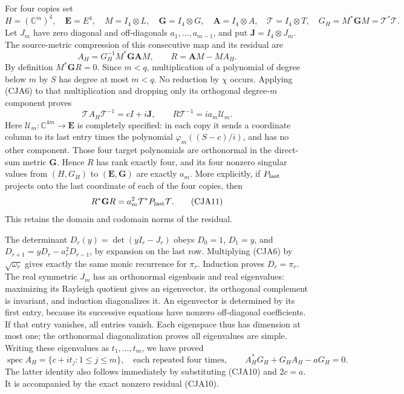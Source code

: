 For four copies set
\[
 H=(\mathbb C^m)^4,\quad
 \mathbf E=E^4,\quad
 M=I_4\otimes L,\quad
 \mathbf G=I_4\otimes G,\quad
 \mathbf A=I_4\otimes A,\quad
 \mathcal T=I_4\otimes T,\quad
 G_H=M^*\mathbf GM=\mathcal T^*\mathcal T.
\]
Let \(J_m\) have zero diagonal and off-diagonals
\(a_1,\ldots,a_{m-1}\), and put \(\mathbf J=I_4\otimes J_m\).
The source-metric compression of this consecutive map and its residual are
\begin{equation}
 A_H=G_H^{-1}M^*\mathbf G\mathbf AM,\qquad
 R=\mathbf AM-MA_H .
 \tag{CJA9}
\end{equation}
By definition \(M^*\mathbf GR=0\).
Since \(m<q\), multiplication of a polynomial of degree below \(m\)
by \(S\) has degree at most \(m<q\).  No reduction by \(\chi\)
occurs.  Applying (CJA6) to that multiplication and dropping only its
orthogonal degree-\(m\) component proves
\begin{equation}
 \boxed{\mathcal TA_H\mathcal T^{-1}=cI+i\mathbf J,\qquad
 R\mathcal T^{-1}=i a_m\mathcal U_m.}
 \tag{CJA10}
\end{equation}
Here \(\mathcal U_m:\mathbb C^{4m}\to\mathbf E\) is completely specified:
in each copy it sends a coordinate column to its last entry times the
polynomial \(\varphi_m((S-c)/i)\), and has no other component.
Those four target polynomials are orthonormal in the direct-sum
metric \(\mathbf G\).  Hence \(R\) has rank exactly four, and its four
nonzero singular values from \((H,G_H)\) to
\((\mathbf E,\mathbf G)\) are exactly \(a_m\).
More explicitly, if \(P_{\rm last}\) projects onto the last coordinate
of each of the four copies, then
\begin{equation}
 R^*\mathbf GR=a_m^2\mathcal T^*P_{\rm last}\mathcal T .
 \tag{CJA11}
\end{equation}
This retains the domain and codomain norms of the residual.

The determinant \(D_r(y)=\det(yI_r-J_r)\) obeys
\(D_0=1\), \(D_1=y\), and
\(D_{r+1}=yD_r-a_r^2D_{r-1}\), by expansion on the last row.
Multiplying (CJA6) by \(\sqrt{\omega_r}\) gives exactly the same
monic recurrence for \(\pi_r\).
Induction proves \(D_r=\pi_r\).
The real symmetric \(J_m\) has an orthonormal eigenbasis and real
eigenvalues: maximizing its Rayleigh quotient gives an eigenvector,
its orthogonal complement is invariant, and induction diagonalizes it.
An eigenvector is determined by its first entry, because its
successive equations have nonzero off-diagonal coefficients.
If that entry vanishes, all entries vanish.  Each eigenspace thus has
dimension at most one; the orthonormal diagonalization proves all
eigenvalues are simple.
Writing these eigenvalues as \(t_1,\ldots,t_m\), we have proved
\begin{equation}
 \operatorname{spec}A_H=\{c+it_j:1\leq j\leq m\},
 \quad\text{each repeated four times},\qquad
 A_H^*G_H+G_HA_H-aG_H=0.
 \tag{CJA12}
\end{equation}
The latter identity also follows immediately by substituting
(CJA10) and \(2c=a\).
It is accompanied by the exact nonzero residual (CJA10).

